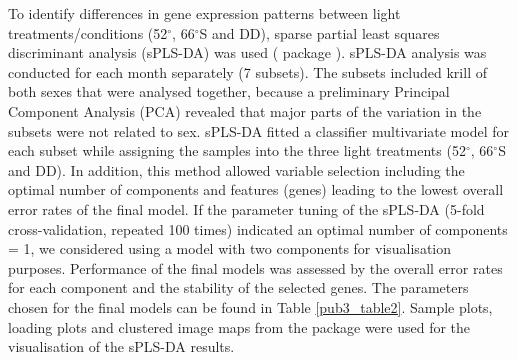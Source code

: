To identify differences in gene expression patterns between light
treatments/conditions (52$^{\circ}$, 66$^{\circ}$S and DD), sparse partial
least squares discriminant analysis (sPLS-DA) was used ( package
 \citep{rohart_mixomics:_2017}). sPLS-DA analysis was conducted
for each month separately (7 subsets). The subsets included krill of both sexes
that were analysed together, because a preliminary Principal Component Analysis
(PCA) revealed that major parts of the variation in the subsets were not
related to sex. sPLS-DA fitted a classifier multivariate model for each subset
while assigning the samples into the three light treatments (52$^{\circ}$,
66$^{\circ}$S and DD). In addition, this method allowed variable selection
including the optimal number of components and features (genes) leading to the
lowest overall error rates of the final model. If the parameter tuning of the
sPLS-DA (5-fold cross-validation, repeated 100 times) indicated an optimal
number of components = 1, we considered using a model with two components for
visualisation purposes. Performance of the final models was assessed by the
overall error rates for each component and the stability of the selected genes.
The parameters chosen for the final models can be found in Table \ref{pub3_table2}. Sample
plots, loading plots and clustered image maps from the  package
 were used for the visualisation of the sPLS-DA results.

